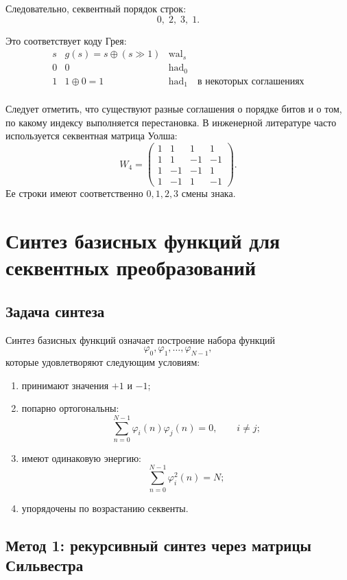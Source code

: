\documentclass[12pt,a4paper]{article}
\begin{document}
Следовательно, секвентный порядок строк:
\[
    0,\;2,\;3,\;1.
\]

Это соответствует коду Грея:
\[
\begin{array}{c|c|c}
s & g(s)=s\oplus(s\gg 1) & \operatorname{wal}_s\\
\hline
0 & 0 & \operatorname{had}_0\\
1 & 1\oplus 0=1 & \operatorname{had}_1 \quad \text{в некоторых соглашениях}\\
\end{array}
\]

Следует отметить, что существуют разные соглашения о порядке битов и о том, по какому индексу выполняется перестановка. В инженерной литературе часто используется секвентная матрица Уолша:
\[
W_4=
\begin{pmatrix}
1&1&1&1\\
1&1&-1&-1\\
1&-1&-1&1\\
1&-1&1&-1
\end{pmatrix}.
\]
Ее строки имеют соответственно $0,1,2,3$ смены знака.

\section{Синтез базисных функций для секвентных преобразований}

\subsection{Задача синтеза}

Синтез базисных функций означает построение набора функций
\[
    \varphi_0,\varphi_1,\ldots,\varphi_{N-1},
\]
которые удовлетворяют следующим условиям:

\begin{enumerate}
    \item принимают значения $+1$ и $-1$;
    \item попарно ортогональны:
    \[
        \sum_{n=0}^{N-1}\varphi_i(n)\varphi_j(n)=0,\qquad i\ne j;
    \]
    \item имеют одинаковую энергию:
    \[
        \sum_{n=0}^{N-1}\varphi_i^2(n)=N;
    \]
    \item упорядочены по возрастанию секвенты.
\end{enumerate}

\subsection{Метод 1: рекурсивный синтез через матрицы Сильвестра}
\end{document}
